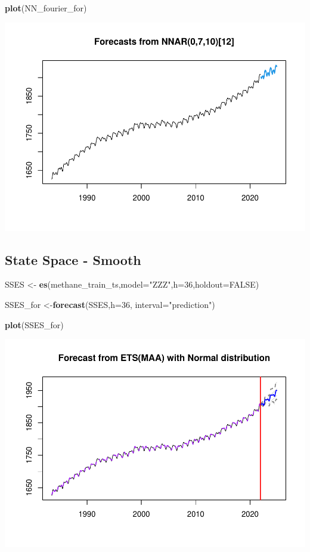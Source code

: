 \documentclass[
]{article}
\newenvironment{Shaded}{\begin{snugshade}}{\end{snugshade}}
\newcommand{\AttributeTok}[1]{\textcolor[rgb]{0.13,0.29,0.53}{#1}}
\newcommand{\ConstantTok}[1]{\textcolor[rgb]{0.56,0.35,0.01}{#1}}
\newcommand{\DecValTok}[1]{\textcolor[rgb]{0.00,0.00,0.81}{#1}}
\newcommand{\FunctionTok}[1]{\textcolor[rgb]{0.13,0.29,0.53}{\textbf{#1}}}
\newcommand{\NormalTok}[1]{#1}
\newcommand{\OtherTok}[1]{\textcolor[rgb]{0.56,0.35,0.01}{#1}}
\newcommand{\StringTok}[1]{\textcolor[rgb]{0.31,0.60,0.02}{#1}}
\begin{document}
\begin{Shaded}
\begin{Highlighting}[]
\FunctionTok{plot}\NormalTok{(NN\_fourier\_for)}
\end{Highlighting}
\end{Shaded}

\includegraphics{Methane_Forecasting_files/figure-latex/unnamed-chunk-15-1.pdf}

\subsection{State Space - Smooth}\label{state-space---smooth}

\begin{Shaded}
\begin{Highlighting}[]
\NormalTok{SSES }\OtherTok{\textless{}{-}} \FunctionTok{es}\NormalTok{(methane\_train\_ts,}\AttributeTok{model=}\StringTok{"ZZZ"}\NormalTok{,}\AttributeTok{h=}\DecValTok{36}\NormalTok{,}\AttributeTok{holdout=}\ConstantTok{FALSE}\NormalTok{)}

\NormalTok{SSES\_for }\OtherTok{\textless{}{-}}\FunctionTok{forecast}\NormalTok{(SSES,}\AttributeTok{h=}\DecValTok{36}\NormalTok{, }\AttributeTok{interval=}\StringTok{"prediction"}\NormalTok{)}

\FunctionTok{plot}\NormalTok{(SSES\_for)}
\end{Highlighting}
\end{Shaded}

\includegraphics{Methane_Forecasting_files/figure-latex/unnamed-chunk-16-1.pdf}
\end{document}
